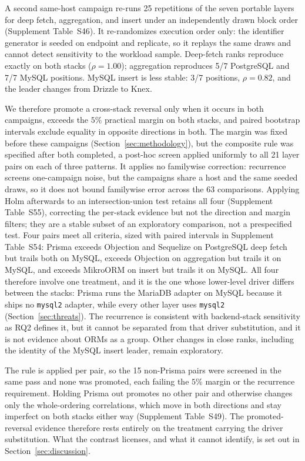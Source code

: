 A second same-host campaign re-runs 25 repetitions of the seven portable layers for deep fetch,
aggregation, and insert under an independently drawn block order (Supplement Table~S46). It
re-randomizes execution order only: the identifier generator is seeded on endpoint and replicate, so
it replays the same draws and cannot detect sensitivity to the workload sample. Deep-fetch ranks reproduce exactly on both stacks ($\rho=1.00$); aggregation reproduces 5/7
PostgreSQL and 7/7 MySQL positions. MySQL insert is less stable: 3/7 positions, $\rho=0.82$, and the
leader changes from Drizzle to Knex. 

We therefore promote a cross-stack reversal only when it occurs in both campaigns, exceeds the $5\%$
practical margin on both stacks, and paired bootstrap intervals exclude equality in opposite
directions in both. The margin was fixed before these campaigns
(Section~\ref{sec:methodology}), but the composite rule was specified after both completed, a
post-hoc screen applied uniformly to all 21 layer pairs on each of three patterns. It applies no
familywise correction: recurrence screens one-campaign noise, but the campaigns share a host and the
same seeded draws, so it does not bound familywise error across the 63 comparisons. Applying Holm
afterwards to an intersection-union test retains all four (Supplement Table~S55), correcting the
per-stack evidence but not the direction and margin filters; they are a stable subset of an
exploratory comparison, not a prespecified test.
Four pairs meet all criteria, sized with paired intervals in Supplement Table~S54: Prisma exceeds
Objection and Sequelize on PostgreSQL deep fetch but trails both on MySQL, exceeds Objection on
aggregation but trails it on MySQL, and exceeds MikroORM on insert but trails it on MySQL. All four
therefore involve one treatment, and it is the one whose lower-level driver differs between the
stacks: Prisma runs the MariaDB adapter on MySQL because it ships no \texttt{mysql2} adapter, while
every other layer uses \texttt{mysql2} (Section~\ref{sec:threats}). The recurrence is consistent
with backend-stack sensitivity as RQ2 defines it, but it cannot be separated from that driver
substitution, and it is not evidence about ORMs as a group. Other changes in close ranks, including
the identity of the MySQL insert leader, remain exploratory.

The rule is applied per pair, so the 15 non-Prisma pairs were screened in the same pass and none was
promoted, each failing the $5\%$ margin or the recurrence requirement. Holding Prisma out promotes
no other pair and otherwise changes only the whole-ordering correlations, which move in both
directions and stay imperfect on both stacks either way (Supplement Table~S49). The
promoted-reversal evidence therefore rests entirely on the treatment carrying the driver
substitution. What the contrast licenses, and what it cannot identify, is set out in
Section~\ref{sec:discussion}.

